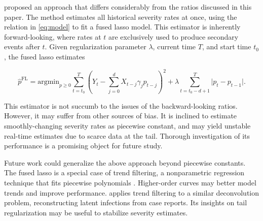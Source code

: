 \documentclass{article}
\renewcommand{\hat}{\widehat} %
\begin{document}


\citet{fusedlasso} proposed an approach that differs considerably from the ratios discussed in this paper. 
The method estimates all historical severity rates at once, using the relation in \eqref{eq:model} to fit a fused lasso model. This estimator is inherently forward-looking, where rates at $t$ are exclusively used to produce secondary events after $t$. Given regularization parameter $\lambda$, current time $T$, and start time $t_0$, the fused lasso estimates

$$\hat{p}^\text{FL} = \text{argmin}_{p \geq 0} \sum_{t=t_0}^T (Y_t-\sum_{j=0}^d X_{t-j}\gamma_j p_{t-j})^2 + \lambda\sum_{t=t_0-d+1}^{T}\lvert p_t - p_{t-1}\rvert.$$

This estimator is not succumb to the issues of the backward-looking ratios. However, it may suffer from other sources of bias. It is inclined to estimate smoothly-changing severity rates as piecewise constant, and may yield unstable real-time estimates due to scarce data at the tail. 
Thorough investigation of its performance is a promising object for future study.

Future work could generalize the above approach beyond piecewise constants. The fused lasso is a special case of trend filtering, a nonparametric regression technique that fits piecewise polynomials \citet{Tibshirani2014}. Higher-order curves may better model trends and improve performance. \citep{Jahja2022} applies trend filtering to a similar deconvolution problem, reconstructing latent infections from case reports. Its insights on tail regularization may be useful to stabilize severity estimates. 
\end{document}

